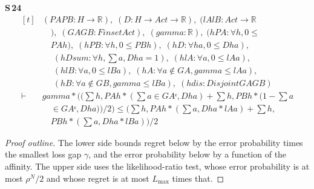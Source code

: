 \noindent\textbf{S\,24}\quad{}
{\footnotesize\[ \begin{aligned}[t]
&(\mathit{PA} \mathit{PB} : \mathit{H} \to \mathbb{R} ),\; (\mathit{D} : \mathit{H} \to \mathit{Act} \to \mathbb{R} ),\; (\mathit{lA} \mathit{lB} : \mathit{Act} \to \mathbb{R}\\
&\quad ),\; (\mathit{GA} \mathit{GB} : \mathit{Finset} \mathit{Act}),\; (\mathit{gamma} : \mathbb{R} ),\; (\mathit{hPA} : \forall \mathit{h}, 0 \leq\\
&\quad \mathit{PA} \mathit{h}),\; (\mathit{hPB} : \forall \mathit{h}, 0 \leq \mathit{PB} \mathit{h}),\; (\mathit{hD} : \forall \mathit{h} \mathit{a}, 0 \leq \mathit{D} \mathit{h} \mathit{a}),\\
&\quad \; (\mathit{hDsum} : \forall \mathit{h}, \textstyle\sum \mathit{a}, \mathit{D} \mathit{h} \mathit{a} = 1),\; (\mathit{hlA} : \forall \mathit{a}, 0 \leq \mathit{lA} \mathit{a}),\\
&\quad \; (\mathit{hlB} : \forall \mathit{a}, 0 \leq \mathit{lB} \mathit{a}),\; (\mathit{hA} : \forall \mathit{a} \notin \mathit{GA}, \mathit{gamma} \leq \mathit{lA} \mathit{a}),\\
&\quad \; (\mathit{hB} : \forall \mathit{a} \notin \mathit{GB}, \mathit{gamma} \leq \mathit{lB} \mathit{a}),\; (\mathit{hdis} : \mathit{Disjoint} \mathit{GA} \mathit{GB})\\
\vdash\;&\mathit{gamma} * ((\textstyle\sum \mathit{h}, \mathit{PA} \mathit{h} * (\textstyle\sum \mathit{a} \in \mathit{GAᶜ}, \mathit{D} \mathit{h} \mathit{a}) + \textstyle\sum \mathit{h}, \mathit{PB} \mathit{h} * (1 - \textstyle\sum \mathit{a}\\
&\quad \in \mathit{GAᶜ}, \mathit{D} \mathit{h} \mathit{a})) / 2) \leq (\textstyle\sum \mathit{h}, \mathit{PA} \mathit{h} * (\textstyle\sum \mathit{a}, \mathit{D} \mathit{h} \mathit{a} * \mathit{lA} \mathit{a}) + \textstyle\sum \mathit{h},\\
&\quad \mathit{PB} \mathit{h} * (\textstyle\sum \mathit{a}, \mathit{D} \mathit{h} \mathit{a} * \mathit{lB} \mathit{a})) / 2
\end{aligned} \]}


\begin{proof}[Proof outline]
The lower side bounds regret below by the error probability times the smallest loss gap
$\gamma$, and the error probability below by a function of the affinity. The upper side uses
the likelihood-ratio test, whose error probability is at most $\rho^{N}/2$ and whose regret
is at most $L_{\max}$ times that.
\end{proof}

